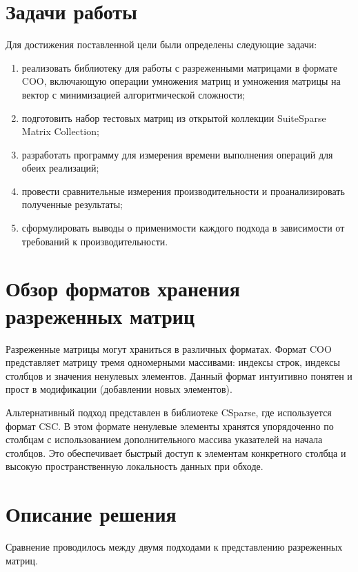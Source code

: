 \documentclass[a4paper]{article}
\begin{document}
\section{Задачи работы}
Для достижения поставленной цели были определены следующие задачи:
\begin{enumerate}
    \item реализовать библиотеку для работы с разреженными матрицами в формате COO, включающую операции умножения матриц и умножения матрицы на вектор с минимизацией алгоритмической сложности;
    \item подготовить набор тестовых матриц из открытой коллекции SuiteSparse Matrix Collection;
    \item разработать программу для измерения времени выполнения операций для обеих реализаций;
    \item провести сравнительные измерения производительности и проанализировать полученные результаты;
    \item сформулировать выводы о применимости каждого подхода в зависимости от требований к производительности.
\end{enumerate}

\section{Обзор форматов хранения разреженных матриц}
Разреженные матрицы могут храниться в различных форматах. Формат COO представляет матрицу тремя одномерными массивами: индексы строк, индексы столбцов и значения ненулевых элементов. Данный формат интуитивно понятен и прост в модификации (добавлении новых элементов).

Альтернативный подход представлен в библиотеке CSparse, где используется формат CSC. В этом формате ненулевые элементы хранятся упорядоченно по столбцам с использованием дополнительного массива указателей на начала столбцов. Это обеспечивает быстрый доступ к элементам конкретного столбца и высокую пространственную локальность данных при обходе.

\section{Описание решения}
Сравнение проводилось между двумя подходами к представлению разреженных матриц.
\end{document}
